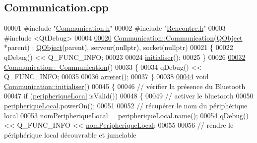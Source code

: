 \hypertarget{_communication_8cpp_source}{}\subsection{Communication.\+cpp}

\begin{DoxyCode}
00001 \textcolor{preprocessor}{#include "\hyperlink{_communication_8h}{Communication.h}"}
00002 \textcolor{preprocessor}{#include "\hyperlink{_rencontre_8h}{Rencontre.h}"}
00003 \textcolor{preprocessor}{#include <QtDebug>}
00004 
\hyperlink{class_communication_a56cf4b262e592bcae1d987c3dd00487f}{00020} \hyperlink{class_communication_a56cf4b262e592bcae1d987c3dd00487f}{Communication::Communication}(\hyperlink{class_q_object}{QObject} *parent) : 
      \hyperlink{class_q_object}{QObject}(parent), serveur(nullptr), socket(nullptr)
00021 \{
00022     qDebug() << Q\_FUNC\_INFO;
00023 
00024     \hyperlink{class_communication_a2c10a52807bc7bdc520ec3fae622f672}{initialiser}();
00025 \}
00026 
\hyperlink{class_communication_a75ba08ce908d45251e28e4c1db94e6f4}{00032} \hyperlink{class_communication_a75ba08ce908d45251e28e4c1db94e6f4}{Communication::~Communication}()
00033 \{
00034     qDebug() << Q\_FUNC\_INFO;
00035 
00036     \hyperlink{class_communication_a1f4b02441803f9c8e231cb9f304d776b}{arreter}();
00037 \}
00038 
\hyperlink{class_communication_a2c10a52807bc7bdc520ec3fae622f672}{00044} \textcolor{keywordtype}{void} \hyperlink{class_communication_a2c10a52807bc7bdc520ec3fae622f672}{Communication::initialiser}()
00045 \{
00046     \textcolor{comment}{// vérifier la présence du Bluetooth}
00047     \textcolor{keywordflow}{if} (\hyperlink{class_communication_a2d643d199169dfe1d258df54d3ee5728}{peripheriqueLocal}.isValid())
00048     \{
00049         \textcolor{comment}{// activer le bluetooth}
00050         \hyperlink{class_communication_a2d643d199169dfe1d258df54d3ee5728}{peripheriqueLocal}.powerOn();
00051 
00052         \textcolor{comment}{// récupérer le nom du périphérique local}
00053         \hyperlink{class_communication_acfe0b2b569ebf174fcdd766272b89ba8}{nomPeripheriqueLocal} = \hyperlink{class_communication_a2d643d199169dfe1d258df54d3ee5728}{peripheriqueLocal}.name();
00054         qDebug() << Q\_FUNC\_INFO << \hyperlink{class_communication_acfe0b2b569ebf174fcdd766272b89ba8}{nomPeripheriqueLocal};
00055 
00056         \textcolor{comment}{// rendre le périphérique local découvrable et jumelable}

\end{DoxyCode}
